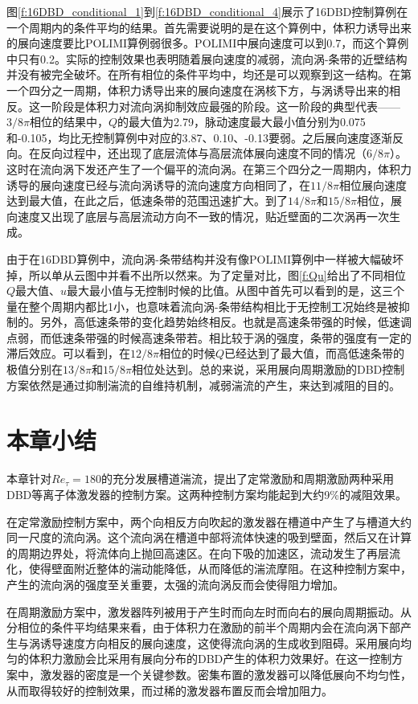 图\ref{f:16DBD_conditional_1}到\ref{f:16DBD_conditional_4}展示了16DBD控制算例在一个周期内的条件平均的结果。首先需要说明的是在这个算例中，体积力诱导出来的展向速度要比POLIMI算例弱很多。POLIMI中展向速度可以到0.7，而这个算例中只有0.2。实际的控制效果也表明随着展向速度的减弱，流向涡-条带的近壁结构并没有被完全破坏。在所有相位的条件平均中，均还是可以观察到这一结构。在第一个四分之一周期，体积力诱导出来的展向速度在涡核下方，与涡诱导出来的相反。这一阶段是体积力对流向涡抑制效应最强的阶段。这一阶段的典型代表——$3/8\pi$相位的结果中，$Q$的最大值为2.79，脉动速度最大最小值分别为0.075和-0.105，均比无控制算例中对应的3.87、0.10、-0.13要弱。之后展向速度逐渐反向。在反向过程中，还出现了底层流体与高层流体展向速度不同的情况（$6/8\pi$）。这时在流向涡下发还产生了一个偏平的流向涡。在第三个四分之一周期内，体积力诱导的展向速度已经与流向涡诱导的流向速度方向相同了，在$11/8\pi$相位展向速度达到最大值，在此之后，低速条带的范围迅速扩大。到了$14/8\pi$和$15/8\pi$相位，展向速度又出现了底层与高层流动方向不一致的情况，贴近壁面的二次涡再一次生成。

由于在16DBD算例中，流向涡-条带结构并没有像POLIMI算例中一样被大幅破坏掉，所以单从云图中并看不出所以然来。为了定量对比，图\ref{f:Qu}给出了不同相位$Q$最大值、$u$最大最小值与无控制时候的比值。从图中首先可以看到的是，这三个量在整个周期内都比1小，也意味着流向涡-条带结构相比于无控制工况始终是被抑制的。另外，高低速条带的变化趋势始终相反。也就是高速条带强的时候，低速调点弱，而低速条带强的时候高速条带若。相比较于涡的强度，条带的强度有一定的滞后效应。可以看到，在$12/8\pi$相位的时候$Q$已经达到了最大值，而高低速条带的极值分别在$13/8\pi$和$15/8\pi$相位处达到。总的来说，采用展向周期激励的DBD控制方案依然是通过抑制湍流的自维持机制，减弱湍流的产生，来达到减阻的目的。

\section{本章小结}
本章针对$Re_\tau=180$的充分发展槽道湍流，提出了定常激励和周期激励两种采用DBD等离子体激发器的控制方案。这两种控制方案均能起到大约9\%的减阻效果。

在定常激励控制方案中，两个向相反方向吹起的激发器在槽道中产生了与槽道大约同一尺度的流向涡。这个流向涡在槽道中部将流体快速的吸到壁面，然后又在计算的周期边界处，将流体向上抛回高速区。在向下吸的加速区，流动发生了再层流化，使得壁面附近整体的湍动能降低，从而降低的湍流摩阻。在这种控制方案中，产生的流向涡的强度至关重要，太强的流向涡反而会使得阻力增加。

在周期激励方案中，激发器阵列被用于产生时而向左时而向右的展向周期振动。从分相位的条件平均结果来看，由于体积力在激励的前半个周期内会在流向涡下部产生与涡诱导速度方向相反的展向速度，这使得流向涡的生成收到阻碍。采用展向均匀的体积力激励会比采用有展向分布的DBD产生的体积力效果好。在这一控制方案中，激发器的密度是一个关键参数。密集布置的激发器可以降低展向不均匀性，从而取得较好的控制效果，而过稀的激发器布置反而会增加阻力。